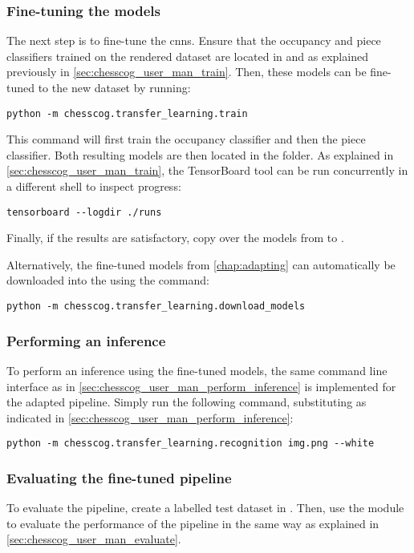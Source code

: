 \documentclass[../../report.tex]{subfiles}
\begin{document}
\subsubsection{Fine-tuning the models}
The next step is to fine-tune the \glspl{cnn}. 
Ensure that the occupancy and piece classifiers trained on the rendered dataset are located in  and  as explained previously in \cref{sec:chesscog_user_man_train}.
Then, these models can be fine-tuned to the new dataset by running:
\begin{verbatim}
python -m chesscog.transfer_learning.train
\end{verbatim}
This command will first train the occupancy classifier and then the piece classifier.
Both resulting models are then located in the  folder.
As explained in \cref{sec:chesscog_user_man_train}, the TensorBoard tool can be run concurrently in a different shell to inspect progress:
\begin{verbatim}
tensorboard --logdir ./runs
\end{verbatim}
Finally, if the results are satisfactory, copy over the models from  to .

Alternatively, the fine-tuned models from \cref{chap:adapting} can automatically be downloaded into the  using the command:
\begin{verbatim}
python -m chesscog.transfer_learning.download_models
\end{verbatim}

\subsubsection{Performing an inference}
To perform an inference using the fine-tuned models, the same command line interface as in \cref{sec:chesscog_user_man_perform_inference} is implemented for the adapted pipeline.
Simply run the following command, substituting as indicated in \cref{sec:chesscog_user_man_perform_inference}:
\begin{verbatim}
python -m chesscog.transfer_learning.recognition img.png --white
\end{verbatim}

\subsubsection{Evaluating the fine-tuned pipeline}
To evaluate the pipeline, create a labelled test dataset in .
Then, use the  module to evaluate the performance of the pipeline in the same way as explained in \cref{sec:chesscog_user_man_evaluate}.
\end{document}
